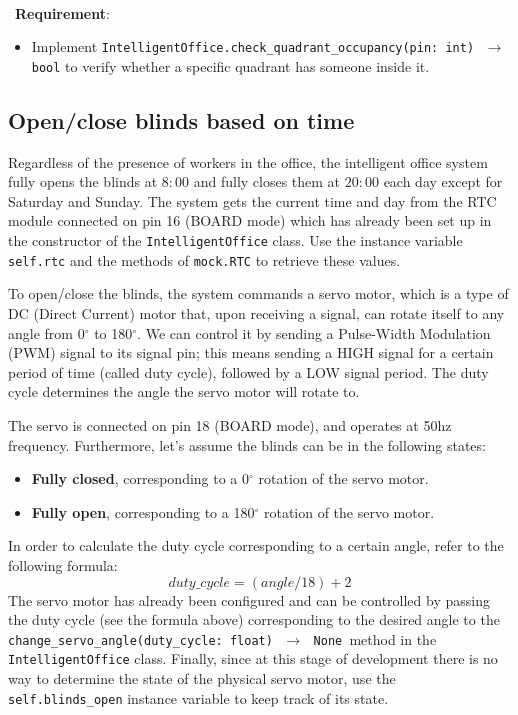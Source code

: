 \ \\ \
\noindent\textbf{Requirement}:
\begin{itemize}
    \item Implement \texttt{IntelligentOffice.check\_quadrant\_occupancy(pin: int) $\,\to\,$ bool} to verify whether a specific quadrant has someone inside it.
\end{itemize}


\subsection{Open/close blinds based on time}
Regardless of the presence of workers in the office, the intelligent office system fully opens the blinds at $8:00$ and fully closes them at $20:00$ each day except for Saturday and Sunday.
The system gets the current time and day from the RTC module connected on pin 16 (BOARD mode) which has already been set up in the constructor of  the \texttt{IntelligentOffice} class. Use the instance variable \texttt{self.rtc} and the methods of \texttt{mock.RTC} to retrieve these values.

To open/close the blinds, the system commands a servo motor, which is a type of DC (Direct Current) motor that, upon receiving a signal, can rotate itself to any angle from 0$^{\circ}$ to 180$^{\circ}$. We can control it by sending a Pulse-Width Modulation (PWM) signal to its signal pin; this means sending a HIGH signal for a certain period of time (called duty cycle), followed by a LOW signal period. The duty cycle determines the angle the servo motor will rotate to.

The servo is connected on pin 18 (BOARD mode), and operates at 50hz frequency. Furthermore, let's assume the blinds can be in the following states:
\begin{itemize}
    \item \textbf{Fully closed}, corresponding to a 0$^{\circ}$ rotation of the servo motor.
    \item \textbf{Fully open}, corresponding to a 180$^{\circ}$ rotation of the servo motor.
\end{itemize}

In order to calculate the duty cycle corresponding to a certain angle, refer to the following formula:
\[
    duty\_cycle = (angle / 18) + 2
\]
The servo motor has already been configured and can be controlled by passing the duty cycle (see the formula above) corresponding to the desired angle to the \texttt{change\_servo\_angle(duty\_cycle: float) $\,\to\,$ None }method in the \texttt{IntelligentOffice} class.
Finally, since at this stage of development there is no way to determine the state of the physical servo motor, use the \texttt{self.blinds\_open} instance variable to keep track of its state.

